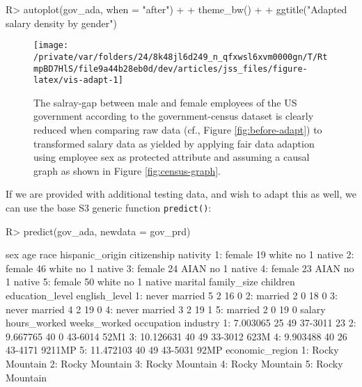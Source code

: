 \documentclass[
  nojss]{jss}
\begin{document}
\begin{CodeChunk}
\begin{CodeInput}
R> autoplot(gov_ada, when = "after") +
+   theme_bw() +
+   ggtitle("Adapted salary density by gender")
\end{CodeInput}
\begin{figure}

{\centering \texttt{[image: /private/var/folders/24/8k48jl6d249\_n\_qfxwsl6xvm0000gn/T/RtmpBD7HlS/file9a44b28eb0d/dev/articles/jss\_files/figure-latex/vis-adapt-1]} 

}

\caption{The salray-gap between male and female employees of the US government according to the government-census dataset is clearly reduced when comparing raw data (cf., Figure \ref{fig:before-adapt}) to transformed salary data as yielded by applying fair data adaption using employee sex as protected attribute and assuming a causal graph as shown in Figure \ref{fig:census-graph}.}\label{fig:vis-adapt}
\end{figure}
\end{CodeChunk}

If we are provided with additional testing data, and wish to adapt this
as well, we can use the base  S3 generic function
\texttt{predict()}:

\begin{CodeChunk}
\begin{CodeInput}
R> predict(gov_ada, newdata = gov_prd)
\end{CodeInput}
\begin{CodeOutput}
      sex age  race hispanic_origin citizenship nativity
1: female  19 white              no           1   native
2: female  46 white              no           1   native
3: female  24  AIAN              no           1   native
4: female  23  AIAN              no           1   native
5: female  50 white              no           1   native
         marital family_size children education_level english_level
1: never married           5        2              16             0
2:       married           2        0              18             0
3: never married           4        2              19             0
4: never married           3        2              19             1
5:       married           2        0              19             0
      salary hours_worked weeks_worked occupation industry
1:  7.003065           25           49    37-3011       23
2:  9.667765           40            0    43-6014     52M1
3: 10.126631           40           49    33-3012     623M
4:  9.903488           40           26    43-4171   9211MP
5: 11.472103           40           49    43-5031     92MP
   economic_region
1:  Rocky Mountain
2:  Rocky Mountain
3:  Rocky Mountain
4:  Rocky Mountain
5:  Rocky Mountain
\end{CodeOutput}
\end{CodeChunk}
\end{document}
